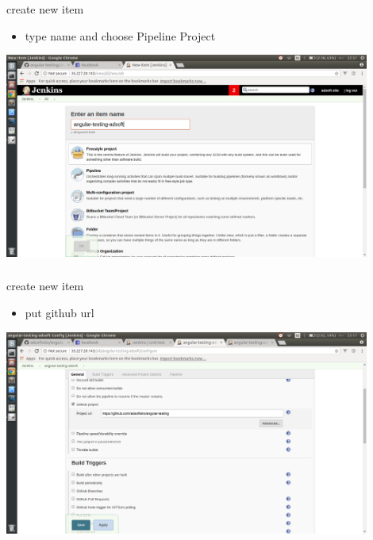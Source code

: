 \documentclass{beamer}
\begin{document}
\begin{frame}\frametitle{} 

\begin{block}{create new item}
\begin{itemize}
\item type name and choose Pipeline Project
\end{itemize}
\end{block}

\begin{center}
\includegraphics[width=0.9\textwidth]{jenkins-newitem.png}
\end{center}

\end{frame}



\begin{frame}\frametitle{} 

\begin{block}{create new item}
\begin{itemize}
\item put github url
\end{itemize}
\end{block}


\begin{center}
\includegraphics[width=0.9\textwidth]{jenkins-github.png}
\end{center}

\end{frame}
\end{document}
